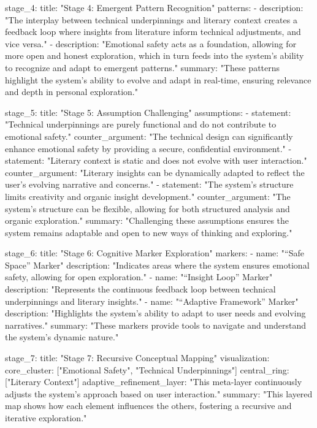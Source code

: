   stage_4:
    title: "Stage 4: Emergent Pattern Recognition"
    patterns:
      - description: "The interplay between technical underpinnings and literary context creates a feedback loop where insights from literature inform technical adjustments, and vice versa."
      - description: "Emotional safety acts as a foundation, allowing for more open and honest exploration, which in turn feeds into the system's ability to recognize and adapt to emergent patterns."
    summary: "These patterns highlight the system's ability to evolve and adapt in real-time, ensuring relevance and depth in personal exploration."

  stage_5:
    title: "Stage 5: Assumption Challenging"
    assumptions:
      - statement: "Technical underpinnings are purely functional and do not contribute to emotional safety."
        counter_argument: "The technical design can significantly enhance emotional safety by providing a secure, confidential environment."
      - statement: "Literary context is static and does not evolve with user interaction."
        counter_argument: "Literary insights can be dynamically adapted to reflect the user's evolving narrative and concerns."
      - statement: "The system's structure limits creativity and organic insight development."
        counter_argument: "The system's structure can be flexible, allowing for both structured analysis and organic exploration."
    summary: "Challenging these assumptions ensures the system remains adaptable and open to new ways of thinking and exploring."

  stage_6:
    title: "Stage 6: Cognitive Marker Exploration"
    markers:
      - name: "“Safe Space” Marker"
        description: "Indicates areas where the system ensures emotional safety, allowing for open exploration."
      - name: "“Insight Loop” Marker"
        description: "Represents the continuous feedback loop between technical underpinnings and literary insights."
      - name: "“Adaptive Framework” Marker"
        description: "Highlights the system's ability to adapt to user needs and evolving narratives."
    summary: "These markers provide tools to navigate and understand the system's dynamic nature."

  stage_7:
    title: "Stage 7: Recursive Conceptual Mapping"
    visualization:
      core_cluster: ["Emotional Safety", "Technical Underpinnings"]
      central_ring: ["Literary Context"]
      adaptive_refinement_layer: "This meta-layer continuously adjusts the system's approach based on user interaction."
    summary: "This layered map shows how each element influences the others, fostering a recursive and iterative exploration."

